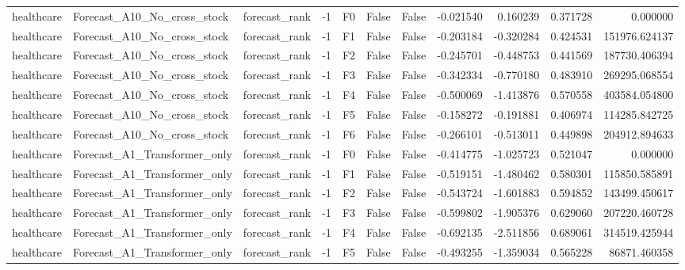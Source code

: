 \begin{tabular}{lllrlllrrrr}
healthcare &  Forecast\_A10\_No\_cross\_stock & forecast\_rank &    -1 &  F0 &           False &            False & -0.021540 &  0.160239 & 0.371728 &         0.000000 \\
healthcare &  Forecast\_A10\_No\_cross\_stock & forecast\_rank &    -1 &  F1 &           False &            False & -0.203184 & -0.320284 & 0.424531 &    151976.624137 \\
healthcare &  Forecast\_A10\_No\_cross\_stock & forecast\_rank &    -1 &  F2 &           False &            False & -0.245701 & -0.448753 & 0.441569 &    187730.406394 \\
healthcare &  Forecast\_A10\_No\_cross\_stock & forecast\_rank &    -1 &  F3 &           False &            False & -0.342334 & -0.770180 & 0.483910 &    269295.068554 \\
healthcare &  Forecast\_A10\_No\_cross\_stock & forecast\_rank &    -1 &  F4 &           False &            False & -0.500069 & -1.413876 & 0.570558 &    403584.054800 \\
healthcare &  Forecast\_A10\_No\_cross\_stock & forecast\_rank &    -1 &  F5 &           False &            False & -0.158272 & -0.191881 & 0.406974 &    114285.842725 \\
healthcare &  Forecast\_A10\_No\_cross\_stock & forecast\_rank &    -1 &  F6 &           False &            False & -0.266101 & -0.513011 & 0.449898 &    204912.894633 \\
healthcare & Forecast\_A1\_Transformer\_only & forecast\_rank &    -1 &  F0 &           False &            False & -0.414775 & -1.025723 & 0.521047 &         0.000000 \\
healthcare & Forecast\_A1\_Transformer\_only & forecast\_rank &    -1 &  F1 &           False &            False & -0.519151 & -1.480462 & 0.580301 &    115850.585891 \\
healthcare & Forecast\_A1\_Transformer\_only & forecast\_rank &    -1 &  F2 &           False &            False & -0.543724 & -1.601883 & 0.594852 &    143499.450617 \\
healthcare & Forecast\_A1\_Transformer\_only & forecast\_rank &    -1 &  F3 &           False &            False & -0.599802 & -1.905376 & 0.629060 &    207220.460728 \\
healthcare & Forecast\_A1\_Transformer\_only & forecast\_rank &    -1 &  F4 &           False &            False & -0.692135 & -2.511856 & 0.689061 &    314519.425944 \\
healthcare & Forecast\_A1\_Transformer\_only & forecast\_rank &    -1 &  F5 &           False &            False & -0.493255 & -1.359034 & 0.565228 &     86871.460358 \\

\end{tabular}
